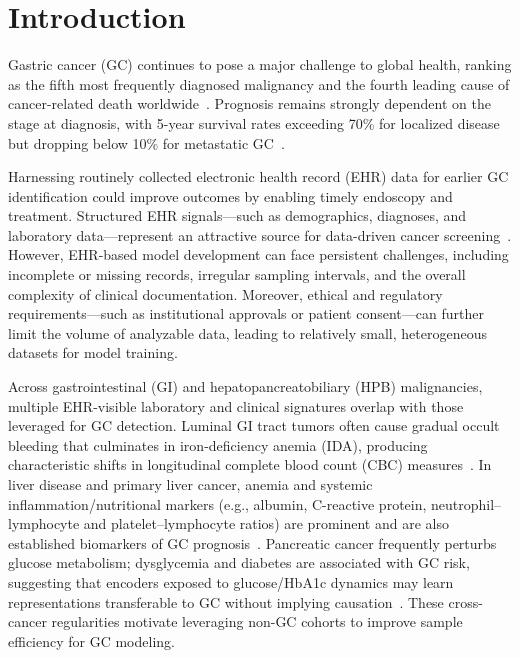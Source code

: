 \documentclass[diagnostics,article,submit,pdftex,moreauthors]{Definitions/mdpi}
\begin{document}
\section{Introduction}
Gastric cancer (GC) continues to pose a major challenge to global health, 
ranking as the fifth most frequently diagnosed malignancy and the fourth leading cause of cancer-related death worldwide~\cite{park2024SHapley}. 
Prognosis remains strongly dependent on the stage at diagnosis, 
with 5-year survival rates exceeding 70\% for localized disease but dropping below 10\% for metastatic GC~\cite{NCI2023stomach}.

Harnessing routinely collected electronic health record (EHR) data for earlier GC identification could improve outcomes by enabling timely endoscopy and treatment.
Structured EHR signals—such as demographics, diagnoses, and laboratory data—represent an attractive source for data-driven cancer screening~\cite{read2023cancers,huang2022jco}.
However, EHR-based model development can face persistent challenges, including incomplete or missing records, irregular sampling intervals, and the overall complexity of clinical documentation.
Moreover, ethical and regulatory requirements—such as institutional approvals or patient consent—can further limit the volume of analyzable data, 
leading to relatively small, heterogeneous datasets for model training.

Across gastrointestinal (GI) and hepatopancreatobiliary (HPB) malignancies, multiple EHR-visible laboratory and clinical signatures overlap with those leveraged for GC detection. 
Luminal GI tract tumors often cause gradual occult bleeding that culminates in iron-deficiency anemia (IDA), producing characteristic shifts in longitudinal complete blood count (CBC) measures~\citep{read2023cancers,Aksoy2019CBC,Krieg2024IDA,Kim2014GIBleed}. 
In liver disease and primary liver cancer, anemia and systemic inflammation/nutritional markers (e.g., albumin, C-reactive protein, neutrophil–lymphocyte and platelet–lymphocyte ratios) are prominent and are also established biomarkers of GC prognosis~\citep{Stein2016Anemia,Gkamprela2017CLDIDA,Crumley2010Albumin,Kim2020Inflam}. 
Pancreatic cancer frequently perturbs glucose metabolism; dysglycemia and diabetes are associated with GC risk, suggesting that encoders exposed to glucose/HbA1c dynamics may learn representations transferable to GC without implying causation~\citep{Shimoyama2013DMGC,Yoon2013DMGC,Guo2022DMGC}. 
These cross-cancer regularities motivate leveraging non-GC cohorts to improve sample efficiency for GC modeling.
\end{document}
